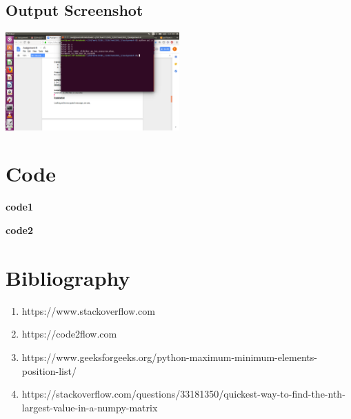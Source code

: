 \documentclass[12pt]{article}
\begin{document}
\subsection{Output Screenshot}
\includegraphics[width=0.5\textwidth]{ps2screenshot.png}
{
\begin{center}
    
\end{center}    
}

\newpage
\section{Code}
\textbf{code1}
  
\textbf{code2}
  

\newpage
\section{Bibliography}
{
\begin{enumerate}
\item https://www.stackoverflow.com
\item https://code2flow.com
\item https://www.geeksforgeeks.org/python-maximum-minimum-elements-position-list/
\item https://stackoverflow.com/questions/33181350/quickest-way-to-find-the-nth-largest-value-in-a-numpy-matrix
\end{enumerate}
}
\end{document}
